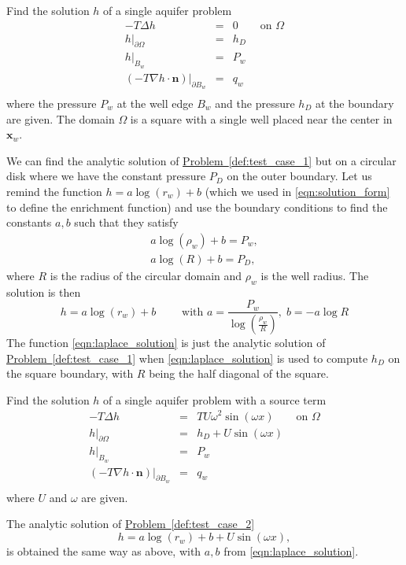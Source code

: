 \documentclass[preprint,12pt]{elsarticle}
\newcommand{\probref}[1]{\hyperref[#1]{Problem~\ref{#1}}}
\def\vc#1{\mathbf{\boldsymbol{#1}}}     %
\begin{document}
\begin{prob} \label{def:test_case_1}
Find the solution $h$ of a single aquifer problem
\begin{eqnarray*} \label{eqn:laplace_problem}
    -T \Delta h &=& 0 \qquad \textrm{on } \Omega \\
    h|_{\partial\Omega} &=& h_D \\
    h|_{B_w} &=& P_w \\
    \left(-T\nabla h\cdot\vc{n}\right)|_{\partial B_w} &=& q_w \\
\end{eqnarray*}
where the pressure $P_w$ at the well edge $B_w$ and the pressure $h_D$ at the boundary are given.
The domain $\Omega$ is a square with a single well placed near the center in $\vc{x}_w$.
\end{prob}
We can find the analytic solution of \probref{def:test_case_1} but on a circular disk where we have the constant 
pressure $P_D$ on the outer boundary. Let us remind the function $h=a\log(r_w)+b$ 
(which we used in \eqref{eqn:solution_form} to define the enrichment function) 
and use the boundary conditions to find the constants $a,b$  such that they satisfy
\begin{eqnarray*}
  a\log(\rho_w) + b = P_w, \\
  a\log(R) + b = P_D,
\end{eqnarray*}
where $R$ is the radius of the circular domain and $\rho_w$ is the well radius.
The solution is then
\begin{equation} \label{eqn:laplace_solution}
  h=a\log(r_w)+b \qquad \textrm{ with } a=\frac{P_w}{\log\left(\frac{\rho_w}{R}\right)}, \; b=-a\log R
\end{equation}
The function \eqref{eqn:laplace_solution} is just the analytic solution of \probref{def:test_case_1} when 
\eqref{eqn:laplace_solution} is used to compute $h_D$ on the square boundary, with $R$ being the half 
diagonal of the square.

\begin{prob} \label{def:test_case_2}
Find the solution $h$ of a single aquifer problem with a source term
\begin{eqnarray*} \label{eqn:poisson_problem}
    -T \Delta h &=& TU\omega^2\sin(\omega x) \qquad \textrm{on } \Omega \\
    h|_{\partial\Omega} &=& h_D + U\sin(\omega x)\\
    h|_{B_w} &=& P_w \\
    \left(-T\nabla h\cdot\vc{n}\right)|_{\partial B_w} &=& q_w \\
\end{eqnarray*}
where $U$ and $\omega$ are given.
\end{prob}
The analytic solution of \probref{def:test_case_2}
\begin{equation} \label{eqn:poisson_solution}
  h=a\log(r_w)+b+U\sin(\omega x),
\end{equation}
is obtained the same way as above, with $a,b$ from \eqref{eqn:laplace_solution}.
\end{document}
